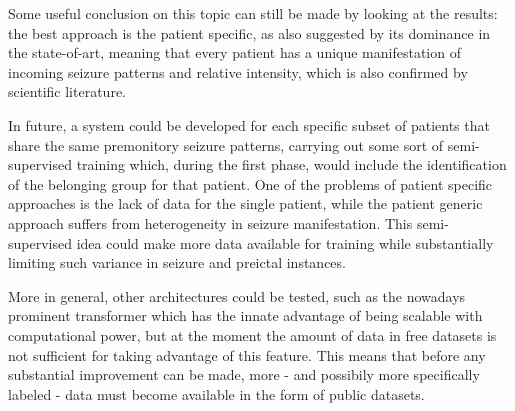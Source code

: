 Some useful conclusion on this topic can still be made by looking at the results: the best approach is the patient specific, as also suggested by its dominance in the state-of-art, meaning that every patient has a unique manifestation of incoming seizure patterns and relative intensity, which is also confirmed by scientific literature.

In future, a system could be developed for each specific subset of patients that share the same premonitory seizure patterns, carrying out some sort of semi-supervised training which, during the first phase, would include the identification of the belonging group for that patient. One of the problems of patient specific approaches is the lack of data for the single patient, while the patient generic approach suffers from heterogeneity in seizure manifestation. This semi-supervised idea could make more data available for training while substantially limiting such variance in seizure and preictal instances.

More in general, other architectures could be tested, such as the nowadays prominent transformer which has the innate advantage of being scalable with computational power, but at the moment the amount of data in free datasets is not sufficient for taking advantage of this feature. This means that before any substantial improvement can be made, more - and possibily more specifically labeled - data must become available in the form of public datasets.